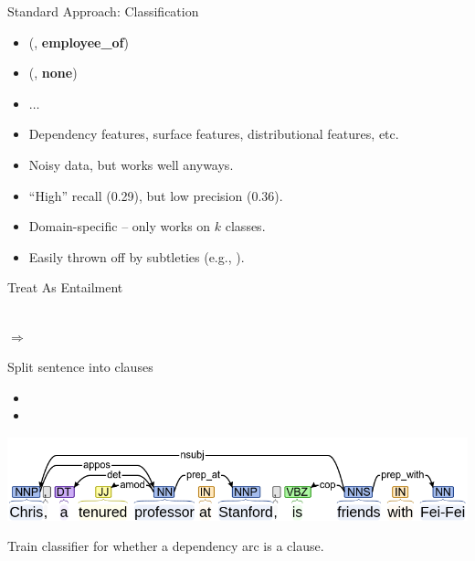 \documentclass[hyperref]{beamer}
\begin{document}
\begin{frame}{Standard Approach: Classification}
\begin{itemize}
  \item (, \textbf{employee\_of})
  \item (, \textbf{none})
  \item $\dots$
\end{itemize}
\pause

\begin{itemize}
  \item Dependency features, surface features, distributional features, etc. 
  \item Noisy data, but works well anyways.
\end{itemize}
\pause

\begin{itemize}
  \item ``High'' recall (0.29), but low precision (0.36).
  \item Domain-specific -- only works on $k$ classes.
  \item Easily thrown off by subtleties (e.g., ).
\end{itemize}
\end{frame}

\begin{frame}{Treat As Entailment}
\begin{center}
   \\ $\Rightarrow$ 
\end{center}

 Split sentence into clauses
\begin{itemize}
  \item[] 
  \item[] 
\end{itemize}
\pause

\begin{center}
  \includegraphics[scale=0.33]{../img/tree-chris-feifei.png}
\end{center}
\pause

 Train classifier for whether a dependency arc is a clause.

\end{frame}
\end{document}
